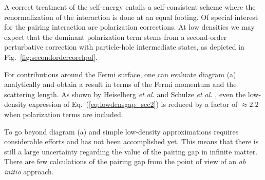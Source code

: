 \documentclass[rmp,aps,floatfix]{revtex4}
\begin{document}
A correct treatment of the self-energy entails a self-consistent
scheme where the renormalization of the interaction is done at an
equal footing. Of special interest for the pairing interaction are
polarization corrections. 
At low densities we may expect that the dominant polarization term stems from 
a second-order perturbative correction with particle-hole intermediate
states, as depicted in Fig.~\ref{fig:secondordercorelpol}.

For contributions around the Fermi surface, one can evaluate diagram (a) 
analytically and obtain a result in terms of 
the Fermi momentum and the scattering length.
As shown by Heiselberg {\em et al.} and Schulze {\em et al.}
\cite{henning2000,spr2001}, even the low-density expression of 
Eq.~(\ref{eq:lowdensgap_sec2}) is reduced by a factor of $\approx 2.2 $
when polarization terms are included.

To go beyond diagram (a) and simple low-density 
approximations requires considerable efforts 
and has not been accomplished yet. This means that there is still a large
uncertainty regarding the value of the pairing gap in infinite matter.
There are few calculations of the pairing gap from the point of view of an 
{\it ab initio} approach.
\end{document}
